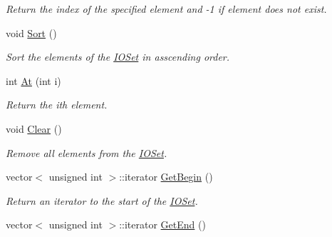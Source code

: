 \begin{DoxyCompactItemize}
\begin{DoxyCompactList}\small\item\em Return the index of the specified element and -\/1 if element does not exist. \item\end{DoxyCompactList}\item 
\hypertarget{class_i_o_set_aa840da94162188f037e18152b7ddbc5d}{
void \hyperlink{class_i_o_set_aa840da94162188f037e18152b7ddbc5d}{Sort} ()}
\label{class_i_o_set_aa840da94162188f037e18152b7ddbc5d}

\begin{DoxyCompactList}\small\item\em Sort the elements of the \hyperlink{class_i_o_set}{IOSet} in asscending order. \item\end{DoxyCompactList}\item 
\hypertarget{class_i_o_set_a260b6fe08d622da8938b01f63221f230}{
int \hyperlink{class_i_o_set_a260b6fe08d622da8938b01f63221f230}{At} (int i)}
\label{class_i_o_set_a260b6fe08d622da8938b01f63221f230}

\begin{DoxyCompactList}\small\item\em Return the ith element. \item\end{DoxyCompactList}\item 
\hypertarget{class_i_o_set_ad9258715a1cdd1d29453326193ac78d6}{
void \hyperlink{class_i_o_set_ad9258715a1cdd1d29453326193ac78d6}{Clear} ()}
\label{class_i_o_set_ad9258715a1cdd1d29453326193ac78d6}

\begin{DoxyCompactList}\small\item\em Remove all elements from the \hyperlink{class_i_o_set}{IOSet}. \item\end{DoxyCompactList}\item 
\hypertarget{class_i_o_set_a35dbca9814fa6b9d663b73decf446435}{
vector$<$ unsigned int $>$::iterator \hyperlink{class_i_o_set_a35dbca9814fa6b9d663b73decf446435}{GetBegin} ()}
\label{class_i_o_set_a35dbca9814fa6b9d663b73decf446435}

\begin{DoxyCompactList}\small\item\em Return an iterator to the start of the \hyperlink{class_i_o_set}{IOSet}. \item\end{DoxyCompactList}\item 
\hypertarget{class_i_o_set_a7353bb13a1e5726be3aed1eff5d3970d}{
vector$<$ unsigned int $>$::iterator \hyperlink{class_i_o_set_a7353bb13a1e5726be3aed1eff5d3970d}{GetEnd} ()}
\label{class_i_o_set_a7353bb13a1e5726be3aed1eff5d3970d}


\end{DoxyCompactItemize}

